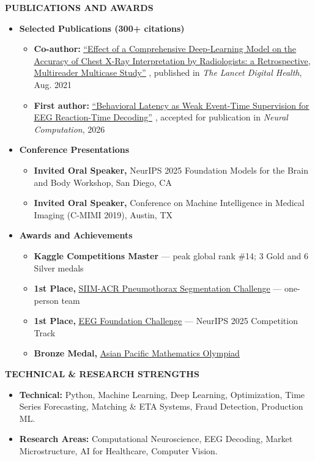 \documentclass[11pt,a4paper]{article}
\newcommand{\sectionletterspacing}[1]{{\addfontfeatures{LetterSpace=14}#1}}
\newcommand{\SectionFont}{\fontsize{15.2}{18.8}\selectfont}
\newcommand{\softuline}[1]{\textcolor{secondary}{\uline{#1}}}
\newcommand{\cvlink}[2]{%
  \href{#2}{\softuline{#1}}%
}
\newcommand{\sectiontitle}[1]{%
  \vspace{0.64em}
  {\centering\SectionFont\bfseries\textcolor{accent}{\sectionletterspacing{#1}}\par}
  \vspace{0.28em}
}
\begin{document}
\sectiontitle{PUBLICATIONS AND AWARDS}

\begin{itemize}
  \item \textbf{Selected Publications (300+ citations)}
  \begin{itemize}
    \item \textbf{Co-author:} \cvlink{``Effect of a Comprehensive Deep-Learning Model on the Accuracy of Chest X-Ray Interpretation by Radiologists: a Retrospective, Multireader Multicase Study''}{https://www.thelancet.com/journals/landig/article/PIIS2589-7500(21)00106-0}, published in \textit{The Lancet Digital Health}, Aug. 2021
    \item \textbf{First author:} \cvlink{``Behavioral Latency as Weak Event-Time Supervision for EEG Reaction-Time Decoding''}{https://arxiv.org/abs/2608.29428}, accepted for publication in \textit{Neural Computation}, 2026
  \end{itemize}

  \item \textbf{Conference Presentations}
  \begin{itemize}
    \item \textbf{Invited Oral Speaker,} NeurIPS 2025 Foundation Models for the Brain and Body Workshop, San Diego, CA
    \item \textbf{Invited Oral Speaker,} Conference on Machine Intelligence in Medical Imaging (C-MIMI 2019), Austin, TX
  \end{itemize}

  \item \textbf{Awards and Achievements}
  \begin{itemize}
    \item \textbf{Kaggle Competitions Master} — peak global rank \#14; 3 Gold and 6 Silver medals
    \item \textbf{1st Place,} \cvlink{SIIM-ACR Pneumothorax Segmentation Challenge}{https://www.kaggle.com/competitions/siim-acr-pneumothorax-segmentation} — one-person team
    \item \textbf{1st Place,} \cvlink{EEG Foundation Challenge}{https://www.codabench.org/competitions/9975/\#/results-tab} — NeurIPS 2025 Competition Track
    \item \textbf{Bronze Medal,} \cvlink{Asian Pacific Mathematics Olympiad}{https://www.apmo-official.org/static/results/apmo2009_res.pdf}
  \end{itemize}
\end{itemize}

\sectiontitle{TECHNICAL \& RESEARCH STRENGTHS}
\begin{itemize}
  \item \textbf{Technical:} Python, Machine Learning, Deep Learning, Optimization, Time Series Forecasting, Matching \& ETA Systems, Fraud Detection, Production ML.
  \item \textbf{Research Areas:} Computational Neuroscience, EEG Decoding, Market Microstructure, AI for Healthcare, Computer Vision.
\end{itemize}
\end{document}
